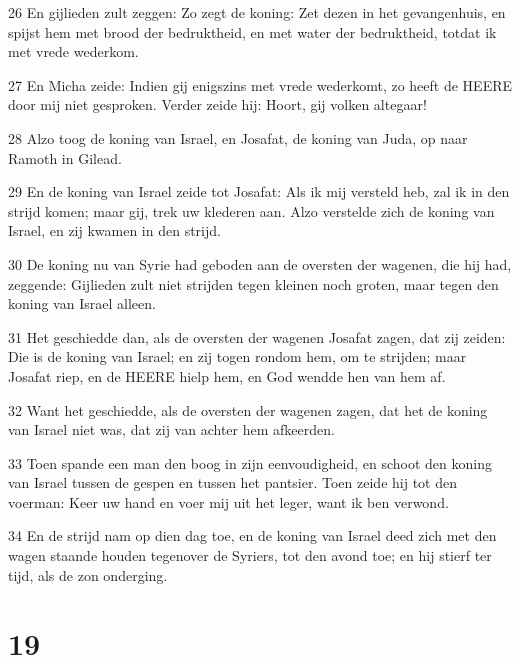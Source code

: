 \par 26 En gijlieden zult zeggen: Zo zegt de koning: Zet dezen in het gevangenhuis, en spijst hem met brood der bedruktheid, en met water der bedruktheid, totdat ik met vrede wederkom.
\par 27 En Micha zeide: Indien gij enigszins met vrede wederkomt, zo heeft de HEERE door mij niet gesproken. Verder zeide hij: Hoort, gij volken altegaar!
\par 28 Alzo toog de koning van Israel, en Josafat, de koning van Juda, op naar Ramoth in Gilead.
\par 29 En de koning van Israel zeide tot Josafat: Als ik mij versteld heb, zal ik in den strijd komen; maar gij, trek uw klederen aan. Alzo verstelde zich de koning van Israel, en zij kwamen in den strijd.
\par 30 De koning nu van Syrie had geboden aan de oversten der wagenen, die hij had, zeggende: Gijlieden zult niet strijden tegen kleinen noch groten, maar tegen den koning van Israel alleen.
\par 31 Het geschiedde dan, als de oversten der wagenen Josafat zagen, dat zij zeiden: Die is de koning van Israel; en zij togen rondom hem, om te strijden; maar Josafat riep, en de HEERE hielp hem, en God wendde hen van hem af.
\par 32 Want het geschiedde, als de oversten der wagenen zagen, dat het de koning van Israel niet was, dat zij van achter hem afkeerden.
\par 33 Toen spande een man den boog in zijn eenvoudigheid, en schoot den koning van Israel tussen de gespen en tussen het pantsier. Toen zeide hij tot den voerman: Keer uw hand en voer mij uit het leger, want ik ben verwond.
\par 34 En de strijd nam op dien dag toe, en de koning van Israel deed zich met den wagen staande houden tegenover de Syriers, tot den avond toe; en hij stierf ter tijd, als de zon onderging.

\chapter{19}

